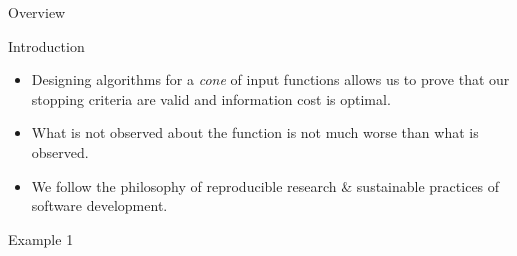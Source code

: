 \documentclass[final]{beamer}
\newlength{\onecolwid}
\begin{document}
\begin{frame}[t]
\begin{columns}[t]
\begin{column}{\onecolwid}
\begin{alertblock}{Overview}
\end{alertblock}


\begin{block}{Introduction}
\begin{itemize}
\item Designing algorithms for a \emph{cone} of input functions allows us to prove that our stopping criteria are valid and information cost is optimal.

\item What is not observed about the function is not much worse than what is observed.
    \item  We follow the philosophy  of  reproducible  research \& sustainable practices of  software development.
\end{itemize}
\end{block}

\begin{block}{Example 1}
	

\end{block}
\end{column}
\end{columns}
\end{frame}
\end{document}
